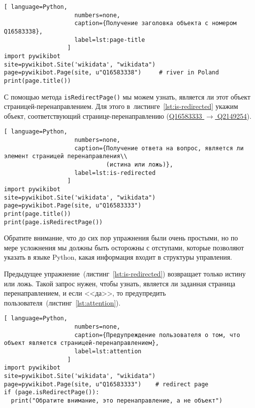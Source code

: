 \begin{lstlisting}[ language=Python,
                    numbers=none,
                    caption={Получение заголовка объекта с номером Q16583338},
                    label=lst:page-title
                  ]
import pywikibot
site=pywikibot.Site('wikidata', "wikidata")
page=pywikibot.Page(site, u"Q16583338")     # river in Poland
print(page.title())
\end{lstlisting}

С помощью метода \lstinline|isRedirectPage()| 
мы можем узнать, является ли этот объект страницей-перенаправлением. 
Для этого в~листинге~\ref{lst:is-redirected} 
укажим объект, соответствующий странице-перена\-пра\-вле\-нию 
(\href{https://www.wikidata.org/w/index.php?title=Q16583333&redirect=no}
      {Q16583333 $\rightarrow$ Q2149254}). 



\begin{lstlisting}[ language=Python,
                    numbers=none,
                    caption={Получение ответа на вопрос, является ли элемент страницей перенаправления\\
                             (истина или ложь)},
                    label=lst:is-redirected
                  ]
import pywikibot
site=pywikibot.Site('wikidata', "wikidata")
page=pywikibot.Page(site, u"Q16583333")
print(page.title())
print(page.isRedirectPage())
\end{lstlisting}

Обратите внимание, что до сих пор упражнения были очень простыми, но по мере усложнения мы должны быть осторожны с отступами, которые позволяют указать в языке Python, какая информация входит в структуры управления.

Предыдущее упражнение~(листинг~\ref{lst:is-redirected}) возвращает только истину или ложь. 
Такой запрос нужен, чтобы узнать, является ли заданная страница перенаправлением, 
и если <<да>>, 
то предупредить пользователя~(листинг~\ref{lst:attention}).



\newpage
\begin{lstlisting}[ language=Python,
                    numbers=none,
                    caption={Предупреждение пользователя о том, что объект является страницей-перенаправлением},
                    label=lst:attention
                  ]
import pywikibot
site=pywikibot.Site('wikidata', "wikidata")
page=pywikibot.Page(site, u"Q16583333")    # redirect page
if (page.isRedirectPage()):
  print("Обратите внимание, это перенаправление, а не объект")
\end{lstlisting}

